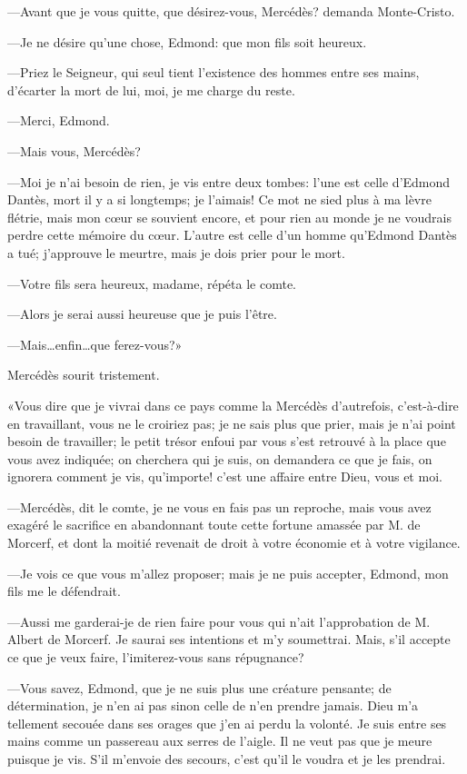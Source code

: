 —Avant que je vous quitte, que désirez-vous, Mercédès? demanda Monte-Cristo. 

—Je ne désire qu'une chose, Edmond: que mon fils soit heureux. 

—Priez le Seigneur, qui seul tient l'existence des hommes entre ses mains, d'écarter la mort de lui, moi, je me charge du reste. 

—Merci, Edmond. 

—Mais vous, Mercédès? 

—Moi je n'ai besoin de rien, je vis entre deux tombes: l'une est celle d'Edmond Dantès, mort il y a si longtemps; je l'aimais! Ce mot ne sied plus à ma lèvre flétrie, mais mon cœur se souvient encore, et pour rien au monde je ne voudrais perdre cette mémoire du cœur. L'autre est celle d'un homme qu'Edmond Dantès a tué; j'approuve le meurtre, mais je dois prier pour le mort. 

—Votre fils sera heureux, madame, répéta le comte. 

—Alors je serai aussi heureuse que je puis l'être. 

—Mais\dots enfin\dots que ferez-vous?» 

Mercédès sourit tristement. 

«Vous dire que je vivrai dans ce pays comme la Mercédès d'autrefois, c'est-à-dire en travaillant, vous ne le croiriez pas; je ne sais plus que prier, mais je n'ai point besoin de travailler; le petit trésor enfoui par vous s'est retrouvé à la place que vous avez indiquée; on cherchera qui je suis, on demandera ce que je fais, on ignorera comment je vis, qu'importe! c'est une affaire entre Dieu, vous et moi. 

—Mercédès, dit le comte, je ne vous en fais pas un reproche, mais vous avez exagéré le sacrifice en abandonnant toute cette fortune amassée par M. de Morcerf, et dont la moitié revenait de droit à votre économie et à votre vigilance. 

—Je vois ce que vous m'allez proposer; mais je ne puis accepter, Edmond, mon fils me le défendrait. 

—Aussi me garderai-je de rien faire pour vous qui n'ait l'approbation de M. Albert de Morcerf. Je saurai ses intentions et m'y soumettrai. Mais, s'il accepte ce que je veux faire, l'imiterez-vous sans répugnance? 

—Vous savez, Edmond, que je ne suis plus une créature pensante; de détermination, je n'en ai pas sinon celle de n'en prendre jamais. Dieu m'a tellement secouée dans ses orages que j'en ai perdu la volonté. Je suis entre ses mains comme un passereau aux serres de l'aigle. Il ne veut pas que je meure puisque je vis. S'il m'envoie des secours, c'est qu'il le voudra et je les prendrai. 

